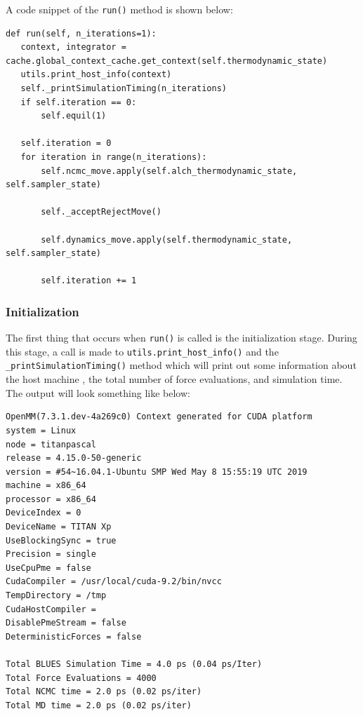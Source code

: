 A code snippet of the \texttt{run()} method is shown below:

\begin{verbatim}
def run(self, n_iterations=1):
   context, integrator = cache.global_context_cache.get_context(self.thermodynamic_state)
   utils.print_host_info(context)
   self._printSimulationTiming(n_iterations)
   if self.iteration == 0:
       self.equil(1)

   self.iteration = 0
   for iteration in range(n_iterations):
       self.ncmc_move.apply(self.alch_thermodynamic_state, self.sampler_state)

       self._acceptRejectMove()

       self.dynamics_move.apply(self.thermodynamic_state, self.sampler_state)

       self.iteration += 1
\end{verbatim}

\hypertarget{initialization}{%
\subsubsection{Initialization}\label{initialization}}

The first thing that occurs when \texttt{run()} is called is the initialization stage.
During this stage, a call is made to \texttt{utils.print_host_info()} and the \texttt{_printSimulationTiming()} method which will print out some information about the host machine , the total number of force evaluations, and simulation time. 
The output will look something like below:

\begin{verbatim}
OpenMM(7.3.1.dev-4a269c0) Context generated for CUDA platform
system = Linux
node = titanpascal
release = 4.15.0-50-generic
version = #54~16.04.1-Ubuntu SMP Wed May 8 15:55:19 UTC 2019
machine = x86_64
processor = x86_64
DeviceIndex = 0
DeviceName = TITAN Xp
UseBlockingSync = true
Precision = single
UseCpuPme = false
CudaCompiler = /usr/local/cuda-9.2/bin/nvcc
TempDirectory = /tmp
CudaHostCompiler =
DisablePmeStream = false
DeterministicForces = false

Total BLUES Simulation Time = 4.0 ps (0.04 ps/Iter)
Total Force Evaluations = 4000
Total NCMC time = 2.0 ps (0.02 ps/iter)
Total MD time = 2.0 ps (0.02 ps/iter)
\end{verbatim}

